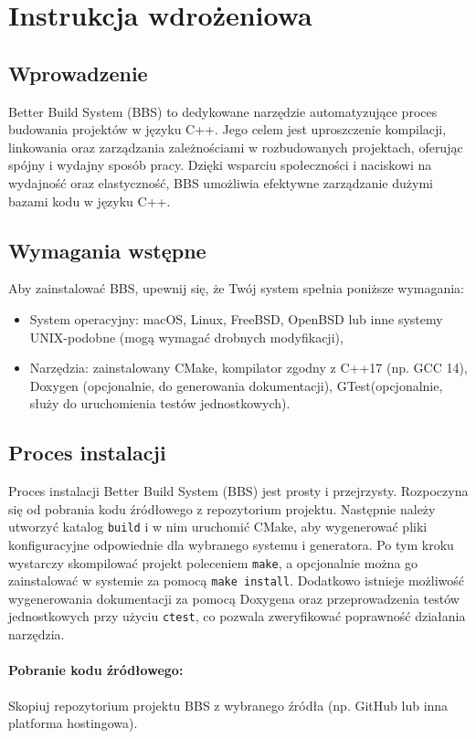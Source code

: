 \section{Instrukcja wdrożeniowa}

\subsection{Wprowadzenie}
Better Build System (BBS) to dedykowane narzędzie automatyzujące proces budowania projektów w języku C++. Jego celem jest uproszczenie kompilacji, linkowania oraz zarządzania zależnościami w rozbudowanych projektach, oferując spójny i wydajny sposób pracy. Dzięki wsparciu społeczności i naciskowi na wydajność oraz elastyczność, BBS umożliwia efektywne zarządzanie dużymi bazami kodu w języku C++.

\subsection{Wymagania wstępne}
Aby zainstalować BBS, upewnij się, że Twój system spełnia poniższe wymagania:
\begin{itemize}
    \item System operacyjny: macOS, Linux, FreeBSD, OpenBSD lub inne systemy UNIX-podobne (mogą wymagać drobnych modyfikacji),
    \item Narzędzia: zainstalowany CMake, kompilator zgodny z C++17 (np. GCC 14), Doxygen (opcjonalnie, do generowania dokumentacji), GTest(opcjonalnie, służy do uruchomienia testów jednostkowych).
\end{itemize}

\subsection{Proces instalacji}
Proces instalacji Better Build System (BBS) jest prosty i przejrzysty. Rozpoczyna się od pobrania kodu źródłowego z repozytorium projektu. Następnie należy utworzyć katalog \texttt{build} i w nim uruchomić CMake, aby wygenerować pliki konfiguracyjne odpowiednie dla wybranego systemu i generatora. Po tym kroku wystarczy skompilować projekt poleceniem \texttt{make}, a opcjonalnie można go zainstalować w systemie za pomocą \texttt{make install}. Dodatkowo istnieje możliwość wygenerowania dokumentacji za pomocą Doxygena oraz przeprowadzenia testów jednostkowych przy użyciu \texttt{ctest}, co pozwala zweryfikować poprawność działania narzędzia.

\paragraph{Pobranie kodu źródłowego:} 
Skopiuj repozytorium projektu BBS z wybranego źródła (np. GitHub lub inna platforma hostingowa).

